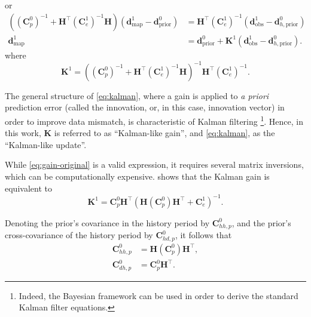 %
or
%
\begin{align}
    ((\mathbf{C}^0_p)^{-1} + \mathbf{H}^\top (\mathbf{C}^1_e)^{-1} \mathbf{H})
    (\mathbf{d}^1_\text{map} - \mathbf{d}^0_\text{prior})
    &=
    \mathbf{H}^\top (\mathbf{C}_e^1)^{-1} (\mathbf{d}^1_\text{obs} - \mathbf{d}^0_{h, \text{prior}}) 
    \\
    \mathbf{d}^1_\text{map}
    &=
    \mathbf{d}^0_\text{prior} +
    \mathbf{K}^1 (\mathbf{d}^1_\text{obs} - \mathbf{d}^0_{h, \text{prior}}).
\label{eq:kalman}
\end{align}
%
where 
%
\begin{equation}
    \mathbf{K}^1 = 
    ((\mathbf{C}^0_p)^{-1} + \mathbf{H}^\top (\mathbf{C}^1_e)^{-1} \mathbf{H})^{-1}
    \mathbf{H}^\top (\mathbf{C}_e^1)^{-1}.
\label{eq:gain-original}
\end{equation}

The general structure of \cref{eq:kalman}, 
where a gain is applied to \emph{a priori} prediction error 
(called the innovation, or, in this case, innovation vector) 
in order to improve data mismatch, 
is characteristic of Kalman filtering%
\footnote{%
    Indeed, the Bayesian framework can be used in order to derive the standard Kalman filter equations.
}.
Hence, in this work, $\mathbf{K}$ is referred to as ``Kalman-like gain'', and \cref{eq:kalman}, as the ``Kalman-like update''.

While \cref{eq:gain-original} is a valid expression, it requires several matrix inversions, which can be computationally expensive.
 shows that the Kalman gain is equivalent to
%
\begin{equation}
    \mathbf{K}^1 = 
    \mathbf{C}^0_p\mathbf{H}^\top
    (\mathbf{H} (\mathbf{C}^0_p) \mathbf{H}^\top + \mathbf{C}^1_e)^{-1}.
\label{eq:gain-woodbury}
\end{equation}

Denoting the prior's covariance in the history period by $\mathbf{C}^0_{hh,p}$,
and the prior's cross-covariance of the history period by $\mathbf{C}^0_{hd,p}$,
it follows that 
%
\begin{subequations}
    \begin{alignat}{4}
        \mathbf{C}^0_{hh,p} &= \mathbf{H} (\mathbf{C}^0_p) \mathbf{H}^\top,
    \\
        \mathbf{C}^0_{dh,p} &= \mathbf{C}^0_p\mathbf{H}^\top.
    \end{alignat}
\label{eq:covs}
\end{subequations}

